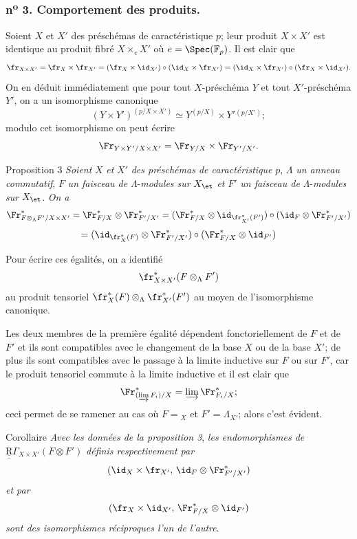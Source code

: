 \subsubsection*{n\textsuperscript{o} 3. Comportement des produits.}

Soient $X$ et $X'$ des préschémas de caractéristique $p$; leur produit $X\times X'$ est identique au produit fibré $X\times_eX'$ où $e=\Spec(\mathbb{F}_p)$. Il est clair que
\[
\fr_{X\times X'}=\fr_X\times\fr_{X'}=(\fr_X\times\id_{X'})\circ(\id_X\times\fr_{X'})
=(\id_X\times\fr_{X'})\circ(\fr_X\times\id_{X'}).
\]
On en déduit immédiatement que pour tout $X$-préschéma $Y$ et tout $X'$-préschéma $Y'$, on a un isomorphisme canonique
\[
(Y\times Y')^{(p/X\times X')}\simeq Y^{(p/X)}\times Y'{}^{(p/X')};
\]
modulo cet isomorphisme on
peut écrire
\[
\Fr_{Y\times Y'/X\times X'}=\Fr_{Y/X}\times\Fr_{Y'/X'}.
\]

\begin{statement}{Proposition 3}
\emph{Soient} $X$ \emph{et} $X'$ \emph{des préschémas de caractéristique} $p$, $\Lambda$ \emph{un anneau commutatif}, $F$ \emph{un faisceau de} $\Lambda$-\emph{modules sur} $X_{\et}$ \emph{et} $F'$ \emph{un faisceau de} $\Lambda$-\emph{modules sur} $X_{\et}$. \emph{On a}
\[
\Fr^*_{F\otimes_\Lambda F'/X\times X'}
=\Fr^*_{F/X}\otimes\Fr^*_{F'/X'}
=(\Fr^*_{F/X}\otimes\id_{\fr_{X'}^*(F')})\circ
(\id_F\otimes\Fr^*_{F'/X'})
\]
\[
=(\id_{\fr_X^*(F)}\otimes\Fr^*_{F'/X'})\circ
(\Fr^*_{F/X}\otimes\id_{F'})
\]
\end{statement}

Pour écrire ces égalités, on a identifié
\[
\fr_{X\times X'}^*(F\otimes_\Lambda F')
\]
au produit tensoriel $\fr_X^*(F)\otimes_\Lambda\fr_{X'}^*(F')$ au moyen de l'isomorphisme canonique.

Les deux membres de la première égalité dépendent fonctoriellement de $F$ et de $F'$ et ils sont compatibles avec le changement de la base $X$ ou de la base $X'$; de plus ils sont compatibles avec le passage à la limite inductive sur $F$ ou sur $F'$, car le produit tensoriel commute à la limite inductive et il est clair que
\[
\Fr^*_{(\varinjlim F_i)/X}=\varinjlim\Fr^*_{F_i/X};
\]
ceci permet de se ramener au cas où $F={}_X$ et $F'=\Lambda_{X'}$; alors c'est évident.

\begin{statement}{Corollaire}
\emph{Avec les données de la proposition 3}, \emph{les endomorphismes de} $\underline{\underline{\mathrm{R}}}\Gamma_{X\times X'}(F\otimes F')$ \emph{définis respectivement par}
\[
(\id_X\times\fr_{X'},\,\id_F\otimes\Fr^*_{F'/X'})
\]
\emph{et par}
\[
(\fr_X\times\id_{X'},\,\Fr^*_{F/X}\otimes\id_{F'})
\]
\emph{sont des isomorphismes réciproques l'un de l'autre}.
\end{statement}

